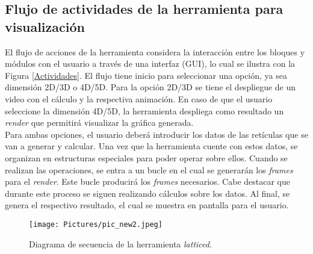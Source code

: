 \documentclass{llncs}
\begin{document}
\subsection{Flujo de actividades de la herramienta para visualización}
El flujo de acciones de la herramienta considera la interacci\'on entre los bloques y módulos con el usuario a través de una interfaz (GUI), lo cual se ilustra con la Figura \ref{Actividades}. El flujo tiene inicio para seleccionar una opci\'on, ya sea dimensi\'on 2D/3D o 4D/5D. Para la opción 2D/3D se tiene el despliegue de un video con el c\'alculo y la respectiva animaci\'on. En caso de que el usuario seleccione la dimensi\'on 4D/5D, la herramienta despliega como resultado un \textit{render} que permitir\'a visualizar la gr\'afica generada.\\
Para ambas opciones, el usuario deberá introducir los datos de las ret\'iculas que se van a generar y calcular. Una vez que la herramienta cuente con estos datos, se organizan en estructuras especiales para poder operar sobre ellos. Cuando se realizan las operaciones, se entra a un bucle en el cual se generar\'an los \textit{frames} para el \textit{render}. Este bucle producir\'a los \textit{frames} necesarios. Cabe destacar que durante este proceso se siguen realizando c\'alculos sobre los datos. Al final, se genera el respectivo resultado, el cual se muestra en pantalla para el usuario. %

\begin{figure}
	\centering
	\texttt{[image: Pictures/pic\_new2.jpeg]}
	\caption{Diagrama de secuencia de la herramienta \textit{latticed}.}
	\label{Secuencia}
\end{figure}
\newpage
\end{document}
